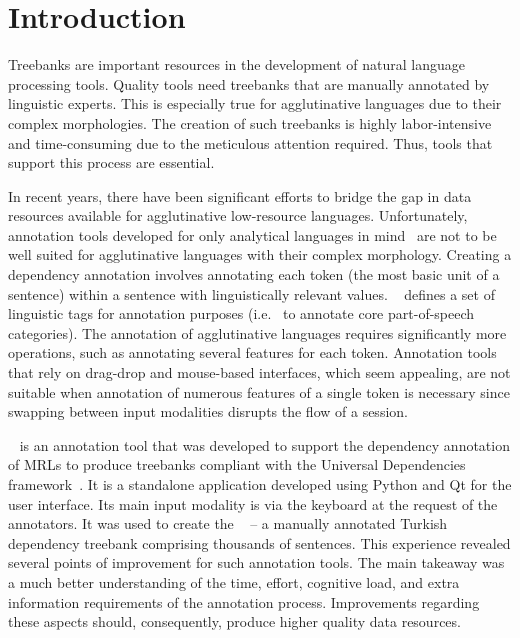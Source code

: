 \section{Introduction}
\label{sec:introduction}

Treebanks are important resources in the development of natural language processing tools.
Quality tools need treebanks that are manually annotated by linguistic experts.
This is especially true for agglutinative languages due to their complex morphologies.
The creation of such treebanks is highly labor-intensive and time-consuming due to the meticulous attention required.
Thus, tools that support this process are essential.

In recent years, there have been significant efforts to bridge the gap in data resources available for agglutinative low-resource languages.
Unfortunately, annotation tools developed for only analytical languages in mind~\cite{UD-tools} are not to be well suited for agglutinative languages with their complex morphology.
Creating a dependency annotation involves annotating each token (the most basic unit of a sentence) within a sentence with linguistically relevant values.
\conllu~\cite{UD} defines a set of linguistic tags for annotation purposes (i.e. \upos\ to annotate core part-of-speech categories).
The annotation of agglutinative languages requires significantly more operations, such as annotating several features for each token.
Annotation tools that rely on drag-drop and mouse-based interfaces, which seem appealing, are not suitable when annotation of numerous features of a single token is necessary since swapping between input modalities disrupts the flow of a session.

\boatvone~\cite{turk2021resources} is an annotation tool that was developed to support the dependency annotation of MRLs to produce treebanks compliant with the Universal Dependencies framework~\cite{UD}.
It is a standalone application developed using Python and Qt for the user interface.
Its main input modality is via the keyboard at the request of the annotators.
It was used to create the \bountreebank~\cite{turk-etal-2019-turkish,turk2021resources,UD-Boun-Treebank} -- a manually annotated Turkish dependency treebank comprising thousands of sentences.
This experience revealed several points of improvement for such annotation tools.
The main takeaway was a much better understanding of the time, effort, cognitive load, and extra information requirements of the annotation process.
Improvements regarding these aspects should, consequently, produce higher quality data resources.

